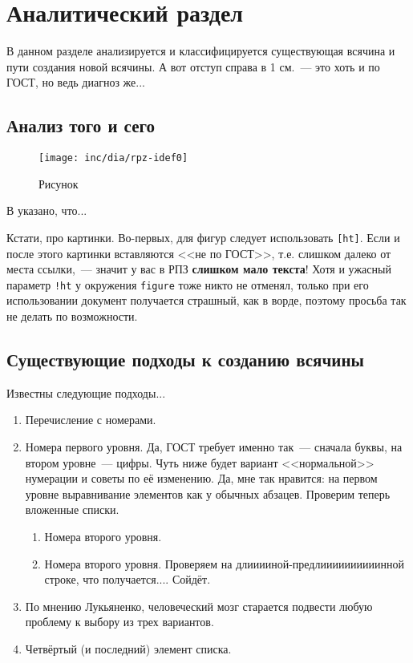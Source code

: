 \chapter{Аналитический раздел}
\label{cha:analysis}
%
%
В данном разделе анализируется и классифицируется существующая всячина и пути создания новой всячины. А вот отступ справа в 1 см.~--- это хоть и по ГОСТ, но ведь диагноз же...

\section{Анализ того и сего}


\begin{figure}
  \centering
  \texttt{[image: inc/dia/rpz-idef0]}
  \caption{Рисунок}
  \label{fig:fig01}
\end{figure}

В \cite{Pup09} указано, что...

Кстати, про картинки. Во-первых, для фигур следует использовать \texttt{[ht]}. Если и после этого картинки вставляются <<не по ГОСТ>>, т.е. слишком далеко от места ссылки,~--- значит у вас в РПЗ \textbf{слишком мало текста}! Хотя и ужасный параметр \texttt{!ht} у окружения \texttt{figure} тоже никто не отменял, только при его использовании документ получается страшный, как в ворде, поэтому просьба так не делать по возможности.

\section{Существующие подходы к созданию всячины}

Известны следующие подходы...

\begin{enumerate}
\item Перечисление с номерами.
\item Номера первого уровня. Да, ГОСТ требует именно так~--- сначала буквы, на втором уровне~--- цифры.
Чуть ниже будет вариант <<нормальной>> нумерации и советы по её изменению.
Да, мне так нравится: на первом уровне выравнивание элементов как у обычных абзацев. Проверим теперь вложенные списки.
\begin{enumerate}
\item Номера второго уровня.
\item Номера второго уровня. Проверяем на длииииной-предлиииииииииинной строке, что получается.... Сойдёт.
\end{enumerate}
\item По мнению Лукьяненко, человеческий мозг старается подвести любую проблему к выбору
  из трех вариантов.
\item Четвёртый (и последний) элемент списка.
\end{enumerate}

